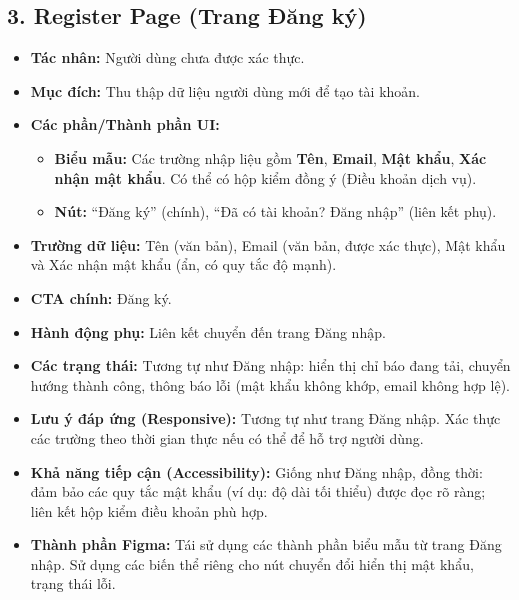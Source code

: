 \documentclass[11pt,a4paper]{article}
\begin{document}
\subsection{3. Register Page (Trang Đăng ký)}
\begin{itemize}
    \item \textbf{Tác nhân:} Người dùng chưa được xác thực.
    \item \textbf{Mục đích:} Thu thập dữ liệu người dùng mới để tạo tài khoản.
    \item \textbf{Các phần/Thành phần UI:}
    \begin{itemize}
        \item \textbf{Biểu mẫu:} Các trường nhập liệu gồm \textbf{Tên}, \textbf{Email}, \textbf{Mật khẩu}, \textbf{Xác nhận mật khẩu}. Có thể có hộp kiểm đồng ý (Điều khoản dịch vụ).
        \item \textbf{Nút:} ``Đăng ký'' (chính), ``Đã có tài khoản? Đăng nhập'' (liên kết phụ).
    \end{itemize}
    \item \textbf{Trường dữ liệu:} Tên (văn bản), Email (văn bản, được xác thực), Mật khẩu và Xác nhận mật khẩu (ẩn, có quy tắc độ mạnh).
    \item \textbf{CTA chính:} Đăng ký.
    \item \textbf{Hành động phụ:} Liên kết chuyển đến trang Đăng nhập.
    \item \textbf{Các trạng thái:} Tương tự như Đăng nhập: hiển thị chỉ báo đang tải, chuyển hướng thành công, thông báo lỗi (mật khẩu không khớp, email không hợp lệ).
    \item \textbf{Lưu ý đáp ứng (Responsive):} Tương tự như trang Đăng nhập. Xác thực các trường theo thời gian thực nếu có thể để hỗ trợ người dùng.
    \item \textbf{Khả năng tiếp cận (Accessibility):} Giống như Đăng nhập, đồng thời: đảm bảo các quy tắc mật khẩu (ví dụ: độ dài tối thiểu) được đọc rõ ràng; liên kết hộp kiểm điều khoản phù hợp.
    \item \textbf{Thành phần Figma:} Tái sử dụng các thành phần biểu mẫu từ trang Đăng nhập. Sử dụng các biến thể riêng cho nút chuyển đổi hiển thị mật khẩu, trạng thái lỗi.
\end{itemize}
\end{document}
